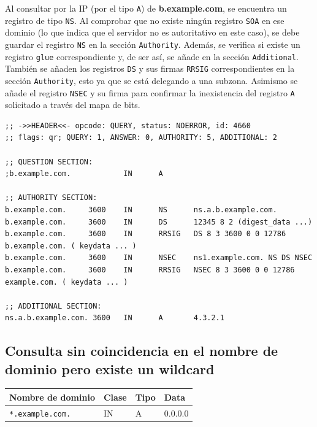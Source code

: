 Al consultar por la IP (por el tipo \texttt{A}) de \textbf{b.example.com}, se encuentra un registro de tipo \texttt{NS}. Al comprobar que no existe ningún registro \texttt{SOA} en ese dominio 
(lo que indica que el servidor no es autoritativo en este caso), se debe guardar el registro \texttt{NS} en la sección \texttt{Authority}. Además, se verifica si 
existe un registro \texttt{glue} correspondiente y, de ser así, se añade en la sección \texttt{Additional}.\\

También se añaden los registros \texttt{DS} y sus firmas \texttt{RRSIG} correspondientes en la sección \texttt{Authority}, esto ya que se está delegando
a una subzona. Asimismo se añade el registro \texttt{NSEC} y su firma para confirmar la inexistencia del registro \texttt{A} solicitado a través del mapa de bits.\\

\newpage

\begin{lstlisting}
;; ->>HEADER<<- opcode: QUERY, status: NOERROR, id: 4660
;; flags: qr; QUERY: 1, ANSWER: 0, AUTHORITY: 5, ADDITIONAL: 2

;; QUESTION SECTION:
;b.example.com.            IN      A

;; AUTHORITY SECTION:
b.example.com.     3600    IN      NS      ns.a.b.example.com.
b.example.com.     3600    IN      DS      12345 8 2 (digest_data ...)
b.example.com.     3600    IN      RRSIG   DS 8 3 3600 0 0 12786 b.example.com. ( keydata ... )
b.example.com.     3600    IN      NSEC    ns1.example.com. NS DS NSEC
b.example.com.     3600    IN      RRSIG   NSEC 8 3 3600 0 0 12786 example.com. ( keydata ... )

;; ADDITIONAL SECTION:
ns.a.b.example.com. 3600   IN      A       4.3.2.1
\end{lstlisting}


\subsection{Consulta sin coincidencia en el nombre de dominio pero existe un wildcard}

\begin{table}[h!]
\centering
\begin{tabular}{llll}
\textbf{Nombre de dominio} & \textbf{Clase} & \textbf{Tipo} & \textbf{Data} \\
\hline
\texttt{*.example.com.} & IN & A & 0.0.0.0 \\
\end{tabular}
\end{table}


